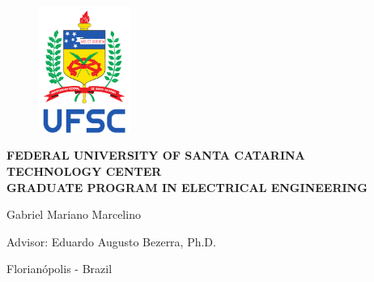 %
%
%
%
%

%
%
%
%
%

\begin{titlepage}
    \thispagestyle{empty}

    \begin{figure}[!ht]
        \begin{center}
            \includegraphics[width=3cm]{figures/ufsc.pdf}
        \end{center}
    \end{figure}

    \begin{center}
        \large{\textbf{FEDERAL UNIVERSITY OF SANTA CATARINA}} \\
        \large{\textbf{TECHNOLOGY CENTER}} \\
        \large{\textbf{GRADUATE PROGRAM IN ELECTRICAL ENGINEERING}} \\
    \end{center}

    \vfill
    \vfill

    \begin{center}
        \Large{\thetitle}
    \end{center}

    \vfill
    \vfill

    \begin{center}
        \large{Gabriel Mariano Marcelino}

        Advisor: Eduardo Augusto Bezerra, Ph.D.
    \end{center}

    \vspace{1cm}

    \begin{center}
        Florianópolis - Brazil

        \the\year
    \end{center}
\end{titlepage}
